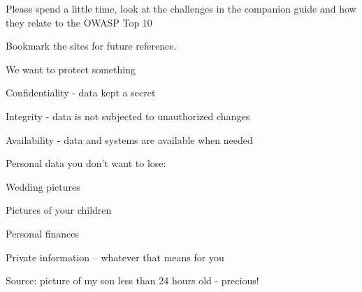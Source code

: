 \documentclass[Screen16to9,17pt]{foils}
\begin{document}
Please spend a little time, look at the challenges in the companion guide and how they relate to the OWASP Top 10

Bookmark the sites for future reference.

\breakdance





\begin{list1}
\item We want to protect something
\item Confidentiality - data kept a secret
\item Integrity - data is not subjected to unauthorized changes
\item Availability - data and systems are available when needed
\end{list1}


\begin{list1}
\item Personal data you don't want to lose:
\begin{list2}
\item Wedding pictures
\item Pictures of your children
\item Personal finances
\item Private information -- whatever that means for you
\end{list2}
\end{list1}

Source: picture of my son less than 24 hours old - precious!

\end{document}
